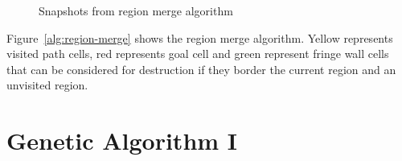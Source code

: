 \begin{figure}[!h]
\centering
            \hfill
            \hfill
            \hfill
            \hfill
            \caption{Snapshots from region merge algorithm}
\label{fig:region-merge}
\end{figure}

Figure~\ref{alg:region-merge} shows the region merge algorithm. Yellow represents visited path cells, red represents goal cell and green represent fringe wall cells that can be considered for destruction if they border the current region and an unvisited region.

\section{Genetic Algorithm I}\label{sec:ga-1}

